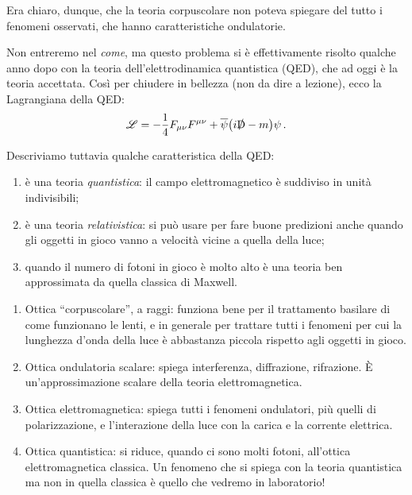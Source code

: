 \documentclass[a4paper,12pt]{article}
\newcommand{\DD}{\mathrm{D}}
\begin{document}
Era chiaro, dunque, che la teoria corpuscolare non poteva spiegare del tutto i fenomeni osservati, che hanno caratteristiche ondulatorie.

Non entreremo nel \emph{come}, ma questo problema si è effettivamente risolto qualche anno dopo con la teoria dell'elettrodinamica quantistica (QED), che ad oggi è la teoria accettata. 
Così per chiudere in bellezza (non da dire a lezione), ecco la Lagrangiana della QED:
%
\begin{align}
\mathscr{L} = - \frac{1}{4}  F_{\mu \nu } F^{\mu \nu }
+ \overline{\psi} \qty(i \slashed{\DD} -m ) \psi 
\,.
\end{align}

Descriviamo tuttavia qualche caratteristica della QED: 
\begin{enumerate}
    \item è una teoria \emph{quantistica}: il campo elettromagnetico è suddiviso in unità indivisibili;
    \item è una teoria \emph{relativistica}: si può usare per fare buone predizioni anche quando gli oggetti in gioco vanno a velocità vicine a quella della luce;
    \item quando il numero di fotoni in gioco è molto alto è una teoria ben approssimata da quella classica di Maxwell.
\end{enumerate}


\begin{enumerate}
    \item Ottica ``corpuscolare'', a raggi: funziona bene per il trattamento basilare di come funzionano le lenti, e in generale per trattare tutti i fenomeni per cui la lunghezza d'onda della luce è abbastanza piccola rispetto agli oggetti in gioco. 
    \item Ottica ondulatoria scalare: spiega interferenza, diffrazione, rifrazione. È un'approssimazione scalare della teoria elettromagnetica.
    \item Ottica elettromagnetica: spiega tutti i fenomeni ondulatori, più quelli di polarizzazione, e l'interazione della luce con la carica e la corrente elettrica.
    \item Ottica quantistica: si riduce, quando ci sono molti fotoni, all'ottica elettromagnetica classica. Un fenomeno che si spiega con la teoria quantistica ma non in quella classica è quello che vedremo in laboratorio!
\end{enumerate}
\end{document}
